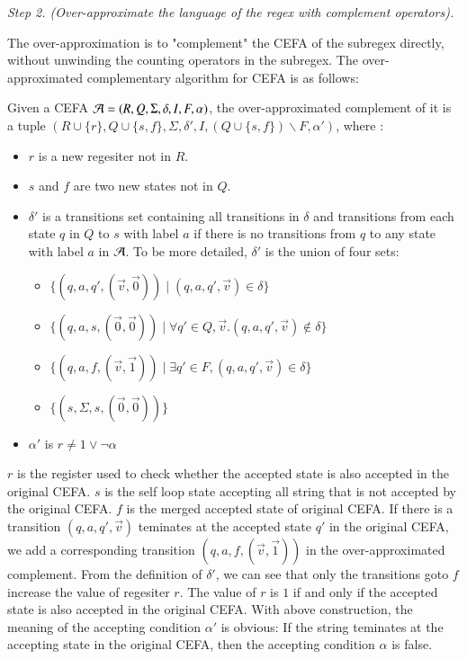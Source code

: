 \medskip
\noindent
\emph{Step 2. (Over-approximate the language of the regex with complement operators).}

The over-approximation is to "complement" the CEFA of the subregex directly, without unwinding the counting operators in the subregex. The over-approximated complementary algorithm for CEFA is as follows:

Given a CEFA $\mathcal{A} = (R, Q, \Sigma, \delta, I, F, \alpha)$, the over-approximated complement of it is a tuple $(R\cup\{r\}, Q\cup\{s,f\}, \Sigma, \delta', I, (Q\cup\{s,f\})\backslash F, \alpha')$, where :
\begin{itemize}
  \item $r$ is a new regesiter not in $R$.
  \item $s$ and $f$ are two new states not in $Q$.
  \item $\delta'$ is a transitions set containing all transitions in $\delta$ and transitions from each state $q$ in $Q$ to $s$ with label $a$ if there is no transitions from $q$ to any state with label $a$ in $\mathcal{A}$. To be more detailed, $\delta'$ is the union of four sets:
  \begin{itemize}
    \item $\{(q, a, q',(\vec{v}, \vec{0})) \mid (q, a, q', \vec{v})\in \delta\}$
    \item $\{(q, a, s,(\vec{0}, \vec{0})) \mid \forall q'\in Q,\vec{v}. (q, a, q', \vec{v})\not\in \delta\}$
    \item $\{(q, a, f,(\vec{v}, \vec{1})) \mid \exists q'\in F, (q, a, q', \vec{v})\in \delta\}$
    \item $\{(s, \Sigma, s, (\vec{0}, \vec{0}))\}$
  \end{itemize}
  \item $\alpha'$ is $r \not= 1\vee \neg \alpha$
\end{itemize}

$r$ is the register used to check whether the accepted state is also accepted in the original CEFA. $s$ is the self loop state accepting all string that is not accepted by the original CEFA. $f$ is the merged accepted state of original CEFA. If there is a transition $(q, a, q', \vec{v})$ teminates at the accepted state $q'$ in the original CEFA, we add a corresponding transition $(q, a, f, (\vec{v}, \vec{1}))$ in the over-approximated complement. From the definition of $\delta'$, we can see that only the transitions goto $f$ increase the value of regesiter $r$. The value of $r$ is $1$ if and only if the accepted state is also accepted in the original CEFA. With above construction, the meaning of the accepting condition $\alpha'$ is obvious: If the string teminates at the accepting state in the original CEFA, then the accepting condition $\alpha$ is false.

